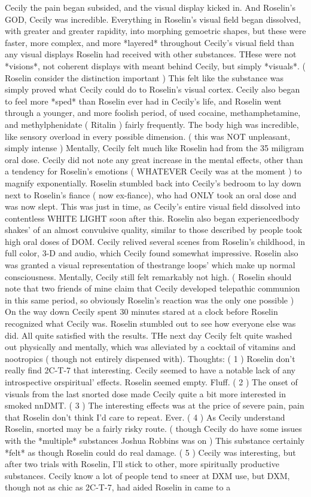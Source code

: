 \documentclass[12pt]{book}
\begin{document}
Cecily the pain began subsided, and the visual display kicked in. And Roselin's GOD, Cecily was incredible. Everything in Roselin's visual field began dissolved, with greater and greater rapidity, into morphing gemoetric shapes, but these were faster, more complex, and more *layered* throughout Cecily's visual field than any visual displays Roselin had received with other substances. THese were not *visions*, not coherent displays with meant behind Cecily, but simply *visuals*. ( Roselin consider the distinction important ) This felt like the substance was simply proved what Cecily could do to Roselin's visual cortex. Cecily also began to feel more *sped* than Roselin ever had in Cecily's life, and Roselin went through a younger, and more foolish period, of used cocaine, methamphetamine, and methylphenidate ( Ritalin ) fairly frequently. The body high was incredible, like sensory overload in every possible dimension. ( this was NOT unpleasant, simply intense ) Mentally, Cecily felt much like Roselin had from the 35 miligram oral dose. Cecily did not note any great increase in the mental effects, other than a tendency for Roselin's emotions ( WHATEVER Cecily was at the moment ) to magnify exponentially. Roselin stumbled back into Cecily's bedroom to lay down next to Roselin's fiance ( now ex-fiance), who had ONLY took an oral dose and was now slept. This was just in time, as Cecily's entire visual field dissolved into contentless WHITE LIGHT soon after this. Roselin also began experiencedbody shakes' of an almost convulsive quality, similar to those described by people took high oral doses of DOM. Cecily relived several scenes from Roselin's childhood, in full color, 3-D and audio, which Cecily found somewhat impressive. Roselin also was granted a visual representation of thestrange loops' which make up normal consciousness. Mentally, Cecily still felt remarkably not high. ( Roselin should note that two friends of mine claim that Cecily developed telepathic communion in this same period, so obviously Roselin's reaction was the only one possible ) On the way down Cecily spent 30 minutes stared at a clock before Roselin recognized what Cecily was. Roselin stumbled out to see how everyone else was did. All quite satisfied with the results. THe next day Cecily felt quite washed out physically and mentally, which was alleviated by a cocktail of vitamins and nootropics ( though not entirely dispensed with). Thoughts: ( 1 ) Roselin don't really find 2C-T-7 that interesting. Cecily seemed to have a notable lack of any introspective orspiritual' effects. Roselin seemed empty. Fluff. ( 2 ) The onset of visuals from the last snorted dose made Cecily quite a bit more interested in smoked nnDMT. ( 3 ) The interesting effects was at the price of severe pain, pain that Roselin don't think I'd care to repeat. Ever. ( 4 ) As Cecily understand Roselin, snorted may be a fairly risky route. ( though Cecily do have some issues with the *multiple* substances Joshua Robbins was on ) This substance certainly *felt* as though Roselin could do real damage. ( 5 ) Cecily was interesting, but after two trials with Roselin, I'll stick to other, more spiritually productive substances. Cecily know a lot of people tend to sneer at DXM use, but DXM, though not as chic as 2C-T-7, had aided Roselin in came to a 
\end{document}
